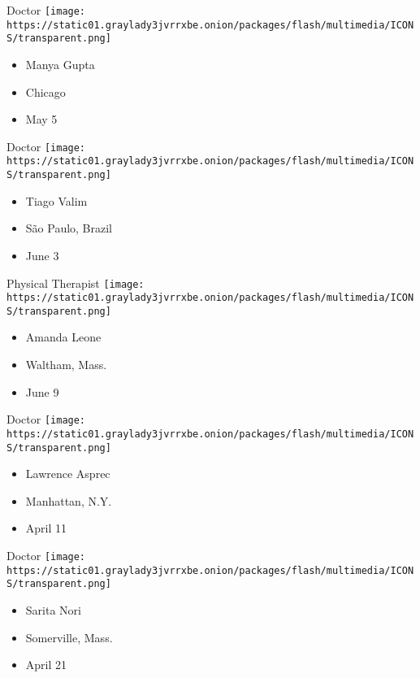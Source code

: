 \protect\hyperlink{item-manya-gupta}{}

Doctor
\texttt{[image: https://static01.graylady3jvrrxbe.onion/packages/flash/multimedia/ICONS/transparent.png]}

\begin{itemize}
\tightlist
\item
  Manya Gupta
\item
  Chicago
\item
  May 5
\end{itemize}

\protect\hyperlink{item-tiago-valim}{}

Doctor
\texttt{[image: https://static01.graylady3jvrrxbe.onion/packages/flash/multimedia/ICONS/transparent.png]}

\begin{itemize}
\tightlist
\item
  Tiago Valim
\item
  São Paulo, Brazil
\item
  June 3
\end{itemize}

\protect\hyperlink{item-amanda-leone}{}

Physical Therapist
\texttt{[image: https://static01.graylady3jvrrxbe.onion/packages/flash/multimedia/ICONS/transparent.png]}

\begin{itemize}
\tightlist
\item
  Amanda Leone
\item
  Waltham, Mass.
\item
  June 9
\end{itemize}

\protect\hyperlink{item-lawrence-asprec}{}

Doctor
\texttt{[image: https://static01.graylady3jvrrxbe.onion/packages/flash/multimedia/ICONS/transparent.png]}

\begin{itemize}
\tightlist
\item
  Lawrence Asprec
\item
  Manhattan, N.Y.
\item
  April 11
\end{itemize}

\protect\hyperlink{item-sarita-nori}{}

Doctor
\texttt{[image: https://static01.graylady3jvrrxbe.onion/packages/flash/multimedia/ICONS/transparent.png]}

\begin{itemize}
\tightlist
\item
  Sarita Nori
\item
  Somerville, Mass.
\item
  April 21
\end{itemize}

